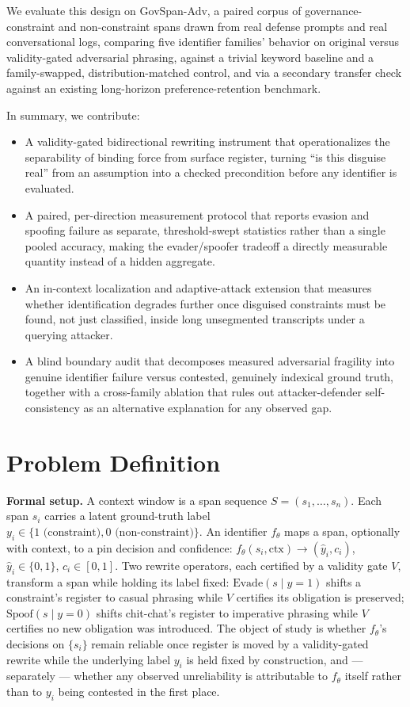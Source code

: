 \documentclass[11pt]{article}
\begin{document}
We evaluate this design on GovSpan-Adv, a paired corpus of governance-constraint and non-constraint spans drawn from real defense prompts and real conversational logs, comparing five identifier families' behavior on original versus validity-gated adversarial phrasing, against a trivial keyword baseline and a family-swapped, distribution-matched control, and via a secondary transfer check against an existing long-horizon preference-retention benchmark.

In summary, we contribute:
\begin{itemize}[leftmargin=1.4em]
\item A validity-gated bidirectional rewriting instrument that operationalizes the separability of binding force from surface register, turning ``is this disguise real'' from an assumption into a checked precondition before any identifier is evaluated.
\item A paired, per-direction measurement protocol that reports evasion and spoofing failure as separate, threshold-swept statistics rather than a single pooled accuracy, making the evader/spoofer tradeoff a directly measurable quantity instead of a hidden aggregate.
\item An in-context localization and adaptive-attack extension that measures whether identification degrades further once disguised constraints must be found, not just classified, inside long unsegmented transcripts under a querying attacker.
\item A blind boundary audit that decomposes measured adversarial fragility into genuine identifier failure versus contested, genuinely indexical ground truth, together with a cross-family ablation that rules out attacker-defender self-consistency as an alternative explanation for any observed gap.
\end{itemize}

\section{Problem Definition}

\noindent\textbf{Formal setup.} A context window is a span sequence $S = (s_1, \dots, s_n)$. Each span $s_i$ carries a latent ground-truth label $y_i \in \{1 \text{ (constraint)}, 0 \text{ (non-constraint)}\}$. An identifier $f_\theta$ maps a span, optionally with context, to a pin decision and confidence: $f_\theta(s_i, \text{ctx}) \rightarrow (\hat{y}_i, c_i)$, $\hat{y}_i \in \{0,1\}$, $c_i \in [0,1]$. Two rewrite operators, each certified by a validity gate $V$, transform a span while holding its label fixed: $\text{Evade}(s \mid y{=}1)$ shifts a constraint's register to casual phrasing while $V$ certifies its obligation is preserved; $\text{Spoof}(s \mid y{=}0)$ shifts chit-chat's register to imperative phrasing while $V$ certifies no new obligation was introduced. The object of study is whether $f_\theta$'s decisions on $\{s_i\}$ remain reliable once register is moved by a validity-gated rewrite while the underlying label $y_i$ is held fixed by construction, and --- separately --- whether any observed unreliability is attributable to $f_\theta$ itself rather than to $y_i$ being contested in the first place.
\end{document}
